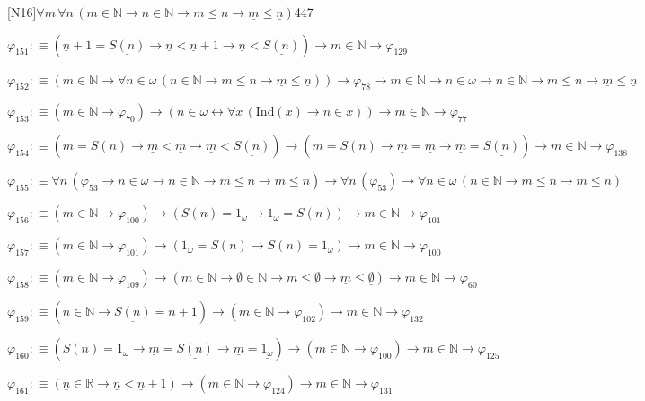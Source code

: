 \begin{fullproof}{[N16]}{$\forall m\,\forall n\,(m \in \mathbb{N} \to n \in \mathbb{N} \to m \leq n \to \underline{m} \leq \underline{n})$}{447}
\begin{abbrevlist}
\item $\varphi_{151} :\equiv (\underline{n} + 1 = \underline{S(n)} \to \underline{n} < \underline{n} + 1 \to \underline{n} < \underline{S(n)}) \to m \in \mathbb{N} \to \varphi_{129}$
\item $\varphi_{152} :\equiv (m \in \mathbb{N} \to \forall n \in \omega\,(n \in \mathbb{N} \to m \leq n \to \underline{m} \leq \underline{n})) \to \varphi_{78} \to m \in \mathbb{N} \to n \in \omega \to n \in \mathbb{N} \to m \leq n \to \underline{m} \leq \underline{n}$
\item $\varphi_{153} :\equiv (m \in \mathbb{N} \to \varphi_{70}) \to (n \in \omega \leftrightarrow \forall x\,(\mathrm{Ind}(x) \to n \in x)) \to m \in \mathbb{N} \to \varphi_{77}$
\item $\varphi_{154} :\equiv (m = S(n) \to \underline{m} < \underline{m} \to \underline{m} < \underline{S(n)}) \to (m = S(n) \to \underline{m} = \underline{m} \to \underline{m} = \underline{S(n)}) \to m \in \mathbb{N} \to \varphi_{138}$
\item $\varphi_{155} :\equiv \forall n\,(\varphi_{53} \to n \in \omega \to n \in \mathbb{N} \to m \leq n \to \underline{m} \leq \underline{n}) \to \forall n\,(\varphi_{53}) \to \forall n \in \omega\,(n \in \mathbb{N} \to m \leq n \to \underline{m} \leq \underline{n})$
\item $\varphi_{156} :\equiv (m \in \mathbb{N} \to \varphi_{100}) \to (S(n) = 1_{\omega} \to 1_{\omega} = S(n)) \to m \in \mathbb{N} \to \varphi_{101}$
\item $\varphi_{157} :\equiv (m \in \mathbb{N} \to \varphi_{101}) \to (1_{\omega} = S(n) \to S(n) = 1_{\omega}) \to m \in \mathbb{N} \to \varphi_{100}$
\item $\varphi_{158} :\equiv (m \in \mathbb{N} \to \varphi_{109}) \to (m \in \mathbb{N} \to \emptyset \in \mathbb{N} \to m \leq \emptyset \to \underline{m} \leq \underline{\emptyset}) \to m \in \mathbb{N} \to \varphi_{60}$
\item $\varphi_{159} :\equiv (n \in \mathbb{N} \to \underline{S(n)} = \underline{n} + 1) \to (m \in \mathbb{N} \to \varphi_{102}) \to m \in \mathbb{N} \to \varphi_{132}$
\item $\varphi_{160} :\equiv (S(n) = 1_{\omega} \to \underline{m} = \underline{S(n)} \to \underline{m} = \underline{1_{\omega}}) \to (m \in \mathbb{N} \to \varphi_{100}) \to m \in \mathbb{N} \to \varphi_{125}$
\item $\varphi_{161} :\equiv (\underline{n} \in \mathbb{R} \to \underline{n} < \underline{n} + 1) \to (m \in \mathbb{N} \to \varphi_{124}) \to m \in \mathbb{N} \to \varphi_{131}$

\end{abbrevlist}
\end{fullproof}
